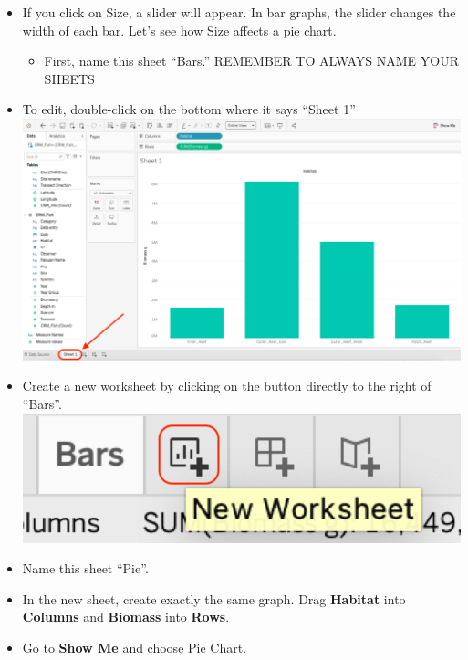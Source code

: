 \documentclass[
]{book}
\providecommand{\tightlist}{%
  \setlength{\itemsep}{0pt}\setlength{\parskip}{0pt}}
\begin{document}
\begin{enumerate}
  \begin{itemize}
  \tightlist
  \item
    If you click on Size, a slider will appear. In bar graphs, the slider changes the width of each bar. Let's see how Size affects a pie chart.

    \begin{itemize}
    \tightlist
    \item
      First, name this sheet ``Bars.'' {REMEMBER TO ALWAYS NAME YOUR SHEETS}\\
    \end{itemize}
  \item
    To edit, double-click on the bottom where it says ``Sheet 1''
    \includegraphics{images/M3S2_rename-sheets.png}
  \item
    Create a new worksheet by clicking on the button directly to the right of ``Bars''.
    \includegraphics{images/M3S2_button.png}
  \item
    Name this sheet ``Pie''.
  \item
    In the new sheet, create exactly the same graph. Drag \textbf{Habitat} into \textbf{Columns} and \textbf{Biomass} into \textbf{Rows}.
  \item
    Go to \textbf{Show Me} and choose Pie Chart.


\end{itemize}
\end{enumerate}
\end{document}
